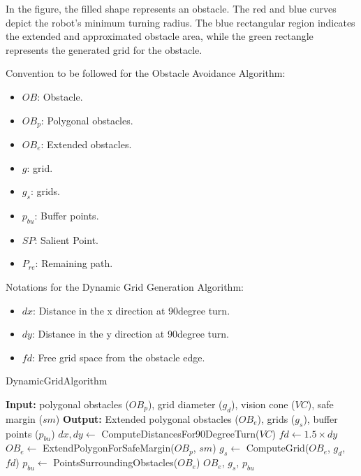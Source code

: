 In the figure, the filled shape represents an obstacle. The red and blue curves depict the robot's minimum turning radius. The blue rectangular region indicates the extended and approximated obstacle area, while the green rectangle represents the generated grid for the obstacle.

\vspace{3mm}  

Convention to be followed for the Obstacle Avoidance Algorithm:
\begin{multicols}{2}
\begin{itemize}[noitemsep,topsep=0pt]
    \item $OB$: Obstacle.
    \item $OB_p$: Polygonal obstacles.
    \item $OB_e$: Extended obstacles.
    \item $g$: grid.
    \item $g_s$: grids.
    \item $p_{bu}$: Buffer points.
    \item $SP$: Salient Point.
    \item $P_{re}$: Remaining path.
\end{itemize}
\end{multicols}
    
\vspace{3mm}  

Notations for the Dynamic Grid Generation Algorithm:
\begin{itemize}[noitemsep,topsep=0pt]
    \item $dx$: Distance in the x direction at 90degree turn.
    \item $dy$: Distance in the y direction at 90degree turn.
    \item $fd$: Free grid space from the obstacle edge.  
\end{itemize}

\begin{algorithm}[H]
    \caption{DynamicGridAlgorithm}
    \label{alg:setup_obstacle_algorithm}
    \begin{algorithmic}[1]
    \Statex \textbf{Input:} polygonal obstacles ($OB_p$), grid diameter ($g_d$), vision cone ($VC$), safe margin ($sm$)
    \Statex \textbf{Output:} Extended polygonal obstacles ($OB_e$), grids ($g_s$), buffer points ($p_{bu}$)
    \newline
    \State $dx, dy \leftarrow$ ComputeDistancesFor90DegreeTurn($VC$)
    \State $fd \leftarrow 1.5 \times dy$
    \State $OB_e \leftarrow$ ExtendPolygonForSafeMargin($OB_p$, $sm$)
    \State $g_s \leftarrow$ ComputeGrid($OB_e$, $g_d$, $fd$)
    \State $p_{bu} \leftarrow$ PointsSurroundingObstacles($OB_e$)
    \State \Return $OB_e$, $g_s$, $p_{bu}$
    \end{algorithmic}
    \end{algorithm}

